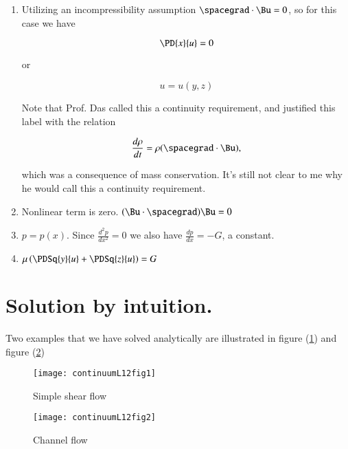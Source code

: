\begin{enumerate}
\item 
Utilizing an incompressibility assumption $\spacegrad \cdot \Bu = 0$, so for this case we have

\begin{equation*}
\PD{x}{u} = 0
\end{equation*}

or 

\begin{equation*}
u = u(y, z)
\end{equation*}

Note that Prof. Das called this a continuity requirement, and justified this label with the relation

\begin{equation}\label{eqn:classicalMechanicsPs2:550}
\frac{d\rho}{dt} = \rho (\spacegrad \cdot \Bu),
\end{equation}

which was a consequence of mass conservation.  It's still not clear to me why he would call this a continuity requirement.

\item Nonlinear term is zero.  $(\Bu \cdot \spacegrad) \Bu = 0$
\item $p = p(x)$.  Since $\frac{d^2 p}{dx^2} = 0$ we also have $\frac{dp}{dx} = -G$, a constant.

\item $\mu \left( \PDSq{y}{u} + \PDSq{z}{u} \right) = G$

\end{enumerate}

\section{Solution by intuition.}

Two examples that we have solved analytically are illustrated in figure (\ref{fig:continuumL12:continuumL12fig1}) and figure (\ref{fig:continuumL12:continuumL12fig2})

\begin{figure}[htp]
   \centering
   \texttt{[image: continuumL12fig1]}
   \caption{Simple shear flow}\label{fig:continuumL12:continuumL12fig1}
\end{figure}
\begin{figure}[htp]
   \centering
   \texttt{[image: continuumL12fig2]}
   \caption{Channel flow}\label{fig:continuumL12:continuumL12fig2}
\end{figure}


